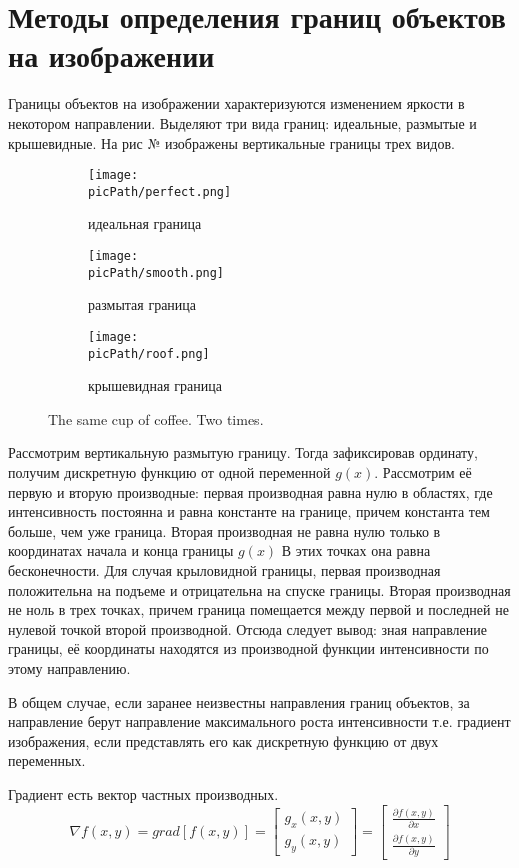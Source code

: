 \documentclass[oneside,final,14pt]{extreport}
\newcommand{\picPath}{pictures}
\begin{document}
\chapter{Методы определения границ объектов на изображении}
Границы объектов на изображении характеризуются изменением яркости в некотором направлении. Выделяют три вида границ: идеальные,  размытые  и крышевидные. На рис № изображены вертикальные границы трех видов.

\begin{figure}[h!]
  \centering
  \begin{subfigure}[b]{0.4\linewidth}
    \texttt{[image: \\picPath/perfect.png]}
    \caption{ идеальная граница}
  \end{subfigure}
  \begin{subfigure}[b]{0.4\linewidth}
    \texttt{[image: \\picPath/smooth.png]}
    \caption{размытая граница}
  \end{subfigure}
  \begin{subfigure}[b]{0.4\linewidth}
    \texttt{[image: \\picPath/roof.png]}
    \caption{крышевидная граница}
  \end{subfigure}
  \caption{The same cup of coffee. Two times.}
  \label{fig:coffee}
\end{figure}

Рассмотрим вертикальную размытую границу. Тогда зафиксировав ординату, получим дискретную функцию от одной переменной $g(x)$. Рассмотрим её первую и вторую производные: первая производная равна нулю в областях, где интенсивность постоянна и равна константе на границе, причем константа тем больше, чем уже граница. Вторая производная не равна нулю только в координатах начала и конца границы $g(x)$ В этих точках она равна бесконечности. Для случая крыловидной границы, первая производная положительна на подъеме и отрицательна на спуске границы. Вторая производная не ноль в трех точках, причем граница помещается между первой и последней не нулевой точкой второй производной. Отсюда следует вывод: зная направление границы, её координаты находятся из производной функции интенсивности по этому направлению. 
 
В общем случае, если заранее неизвестны направления границ объектов, за направление берут направление максимального роста интенсивности  т.е. градиент изображения, если представлять его как дискретную функцию от двух переменных. 

Градиент есть вектор частных производных.
\begin{equation}
\nabla f(x,y) 
= 
grad[f(x,y)]
=
\begin{bmatrix}
g_x(x,y)\\
g_y(x,y)
\end{bmatrix}
=
\begin{bmatrix}
\frac{\partial f(x,y)}
{\partial x}\\
\frac{\partial f(x,y)}
{\partial y}
\end{bmatrix}
\end{equation}
\end{document}
